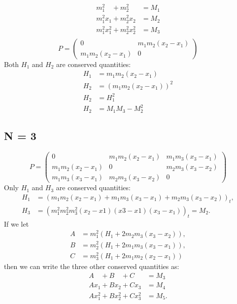 \documentclass[english,master]{liumaiex}
\theoremstyle{plain}
\theoremstyle{definition}
\begin{document}
\begin{align}
	m_1^2\phantom{x_1} + m_2^2\phantom{x_2} &= M_1 \\
	m_1^2 x_1 + m_2^2 x_2 &= M_2 \\
	m_1^2 x_1^2 + m_2^2 x_2^2 &= M_3 \\
\end{align}
%
\begin{equation}
P = \begin{pmatrix}
	0 & m_1 m_2 (x_2 - x_1) \\
	m_1 m_2 (x_2 - x_1) & 0
\end{pmatrix}
\end{equation}
Both $H_1$ and $H_2$ are conserved quantities:
\begin{align}
	H_1 &= m_1 m_2 (x_2 - x_1) \\
	H_2 &= (m_1 m_2 (x_2 - x_1))^2 \\
	H_2 &= H_1^2 \\
	H_2 &= M_1M_3 - M_2^2
\end{align}

\subsection{N = 3}

\begin{equation}
P = \begin{pmatrix}
	0 & m_1 m_2 (x_2 - x_1) & m_1 m_3 (x_3 - x_1) \\
	m_1 m_2 (x_2 - x_1) & 0 & m_2 m_3 (x_3 - x_2) \\
	m_1 m_3 (x_3 - x_1) & m_2 m_3 (x_3 - x_2) & 0
\end{pmatrix}
\end{equation}
Only $H_1$ and $H_3$ are conserved quantities:
\begin{align}
	H_1 &= (m_1m_2(x_2 - x_1) + m_1m_3(x_3 - x_1) + m_2m_3(x_3 - x_2))_t, \\
	H_3 &= (m_1^2m_2^2m_3^2(x_2 - x1)(x3 - x1)(x_3 - x_1))_t = M_2.
\end{align}
If we let
\begin{align}
	A & = m_1^2(H_1 + 2m_2m_3(x_3-x_2)), \\
	B & = m_2^2(H_1 + 2m_1m_3(x_3-x_1)), \\
	C & = m_3^2(H_1 + 2m_1m_2(x_2-x_1))
\end{align}
then we can write the three other conserved quantities as:
\begin{align}
	A\phantom{x_1} + B\phantom{x_2} + C\phantom{x_3} &= M_3 \\
	Ax_1 + Bx_2 + Cx_3 &= M_4 \\
	Ax_1^2 + Bx_2^2 + Cx_3^2 &= M_5.
\end{align}
\end{document}
